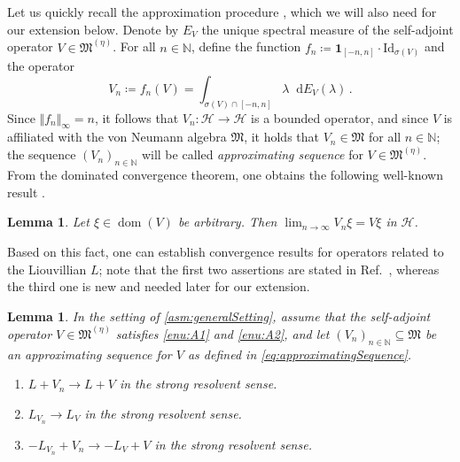 \documentclass[a4paper, twoside, 11pt, reqno]{amsart}
\theoremstyle{definition}
\theoremstyle{plain}
\newtheorem{lemma}[definition]{Lemma}
\renewcommand{\subset}{\subseteq}
\newcommand{\N}{\mathbb{N}}
\newcommand{\MH}{\mathcal{H}}
\newcommand{\MFM}{\mathfrak{M}}
\renewcommand{\AE}[1]{#1^{(\eta)}}
\newcommand{\id}{\mathrm{Id}}
\newcommand{\1}{\mathbf{1}}
\newcommand{\diff}{\mathop{}\!\mathrm{d}}
\DeclareMathOperator{\dom}{dom}
\newcommand{\norm}[2][]{#1\Vert{#2}#1\Vert}
\newcommand{\ce}{\coloneqq}
\begin{document}
Let us quickly recall the approximation procedure \cite[p. 479]{DJP03}, which we will also need for our extension below. Denote by $E_V$ the unique spectral measure of the self-adjoint operator $V \in \AE{\MFM}$. For all $n \in \N$, define the function $f_n \ce \1_{[-n, n]} \cdot \id_{\sigma(V)}$ and the operator
\begin{equation}\label{eq:approximatingSequence}
    V_n \ce f_n(V) = \int_{\sigma(V) \cap [-n, n]} \lambda \diff E_V(\lambda) \, .
\end{equation}
Since $\norm{f_n}_\infty = n$, it follows that $V_n : \MH \to \MH$ is a bounded operator, and since $V$ is affiliated with the von Neumann algebra $\MFM$, it holds that $V_n \in \MFM$ for all $n \in \N$; the sequence $(V_n)_{n \in \N}$ will be called \emph{approximating sequence} for $V \in \AE{\MFM}$. From the dominated convergence theorem, one obtains the following well-known result \cite[Prop. 6.12]{Moretti19}.

\begin{lemma}\label{lem:convergenceUnboundedApproximation}
    Let $\xi \in \dom(V)$ be arbitrary. Then $\lim_{n \to \infty} V_n \xi = V \xi$ in $\MH$.
\end{lemma}

Based on this fact, one can establish convergence results for operators related to the Liouvillian $L$; note that the first two assertions are stated in Ref.~\cite[Thm. 5.6]{DJP03}, whereas the third one is new and needed later for our extension.

\begin{lemma}\label{lem:convergenceLiouvillian}
    In the setting of \cref{asm:generalSetting}, assume that the self-adjoint operator $V \in \AE{\MFM}$ satisfies \ref{enu:A1} and \ref{enu:A2}, and let $(V_n)_{n \in \N} \subset \MFM$ be an approximating sequence for $V$ as defined in \cref{eq:approximatingSequence}.
    \begin{enumerate}
        \item \label{enu:convUnperturbedL} $L + V_n \to L + V$ in the strong resolvent sense.
        \item \label{enu:convPerturbedL} $L_{V_n} \to L_V$ in the strong resolvent sense.
        \item \label{enu:convSum} $- L_{V_n} + V_n \to - L_V + V$ in the strong resolvent sense.
    \end{enumerate}
\end{lemma}
\end{document}
